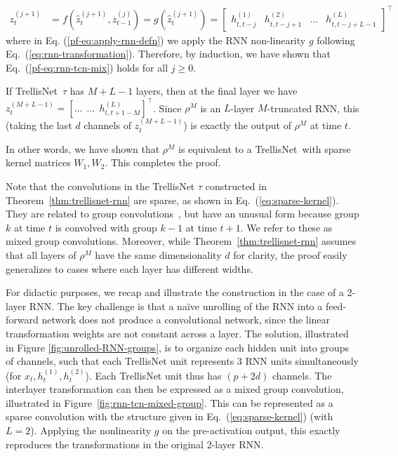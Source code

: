 \documentclass{article} \usepackage{iclr2019_conference,times}
\newcommand{\model}{TrellisNet}
\newenvironment{proofidx}[1]{\renewcommand{\proofname}{Proof of Theorem #1}\proof}{\endproof}
\begin{document}
\begin{proofidx}{\ref{thm:trellisnet-rnn}}
\begin{align}
\\
z_t^{(j+1)} &= f(\hat{z}_t^{(j+1)}, z_{t-1}^{(j)}) = g(\hat{z}_t^{(j+1)}) = \begin{bmatrix} h_{t, t-j}^{(1)} & h_{t, t-j+1}^{(2)} & \dots & h_{t, t-j+L-1}^{(L)} \end{bmatrix}^\top \label{pf-eq:apply-rnn-defn}
\end{align}
where in Eq. (\ref{pf-eq:apply-rnn-defn}) we apply the RNN non-linearity $g$ following Eq.~(\ref{eq:rnn-transformation}). Therefore, by induction, we have shown that Eq.~(\ref{pf-eq:rnn-tcn-mix}) holds for all $j \geq 0$.

If \model~$\tau$ has $M+L-1$ layers, then at the final layer we have \small$z_t^{(M+L-1)} = [\dots \ \ \dots \ \ h_{t, t+1-M}^{(L)}]^\top$\normalsize. Since $\rho^M$ is an $L$-layer $M$-truncated RNN, this (taking the last $d$ channels of $z_t^{(M+L-1)}$) is exactly the output of $\rho^M$ at time $t$.

In other words, we have shown that $\rho^M$ is equivalent to a \model~with sparse kernel matrices $W_1, W_2$. This completes the proof.
\end{proofidx}

Note that the convolutions in the TrellisNet $\tau$ constructed in Theorem~\ref{thm:trellisnet-rnn} are sparse, as shown in Eq.~(\ref{eq:sparse-kernel}). They are related to group convolutions~\citep{krizhevsky2012imagenet}, but have an unusual form because group $k$ at time $t$ is convolved with group $k-1$ at time $t+1$. We refer to these as mixed group convolutions. Moreover, while Theorem~\ref{thm:trellisnet-rnn} assumes that all layers of $\rho^M$ have the same dimensionality $d$ for clarity, the proof easily generalizes to cases where each layer has different widths.

For didactic purposes, we recap and illustrate the construction in the case of a 2-layer RNN. The key challenge is that a na\"ive unrolling of the RNN into a feed-forward network does not produce a convolutional network, since the linear transformation weights are not constant across a layer. The solution, illustrated in Figure \ref{fig:unrolled-RNN-groups}, is to organize each hidden unit into groups of channels, such that each TrellisNet unit represents 3 RNN units simultaneously (for \small$x_t, h_t^{(1)}, h_t^{(2)}$\normalsize). Each TrellisNet unit thus has $(p+2d)$ channels. The interlayer transformation can then be expressed as a mixed group convolution, illustrated in Figure~\ref{fig:rnn-tcn-mixed-group}. This can be represented as a sparse convolution with the structure given in Eq.~(\ref{eq:sparse-kernel}) (with $L=2$). Applying the nonlinearity $g$ on the pre-activation output, this exactly reproduces the transformations in the original 2-layer RNN.
\end{document}
